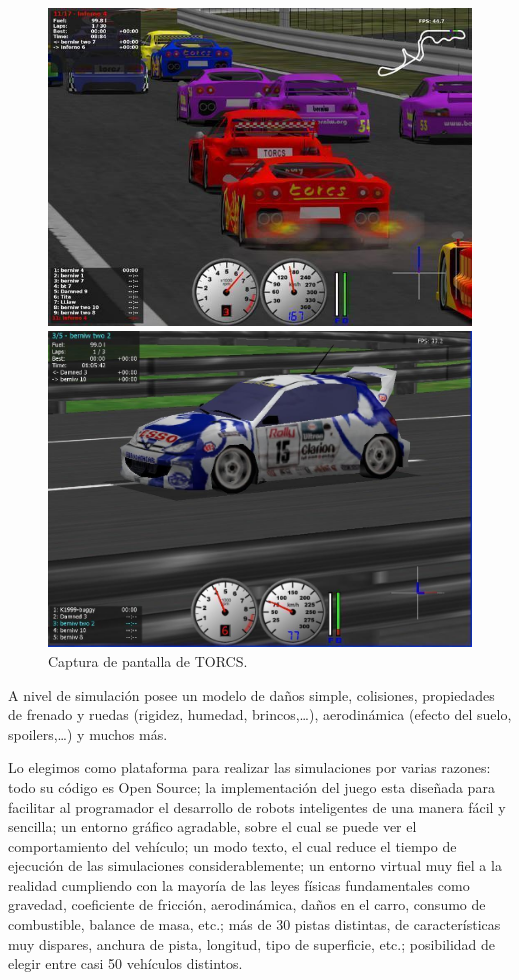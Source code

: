 \begin{figure}[ht]
\begin{minipage}[b]{0.5\linewidth}
\centering
\includegraphics[width=0.7\linewidth]{figures/torcs_screenshot3.jpg}
\end{minipage}
\begin{minipage}[b]{0.5\linewidth}
\centering
\includegraphics[width=0.7\linewidth]{figures/torcs3.jpg}
\end{minipage}
\caption{Captura de pantalla de \gls{TORCS}.}
\end{figure} 

A nivel de simulación posee un modelo de daños simple, colisiones, propiedades de frenado y ruedas (rigidez, humedad, brincos,…), aerodinámica (efecto del suelo, spoilers,…) y muchos más.

Lo elegimos como plataforma para realizar las simulaciones por varias razones: todo su código es \gls{Open Source}; la implementación del juego esta diseñada para facilitar al programador el desarrollo de robots inteligentes de una manera fácil y sencilla; un entorno gráfico agradable, sobre el cual se puede ver el comportamiento del vehículo; un modo texto, el cual reduce el tiempo de ejecución de las simulaciones considerablemente; un entorno virtual muy fiel a la realidad cumpliendo con la mayoría de las leyes físicas fundamentales como gravedad, coeficiente de fricción, aerodinámica, daños en el carro, consumo de combustible, balance de masa, etc.; más de 30 pistas distintas, de características muy dispares, anchura de pista, longitud, tipo de superficie, etc.; posibilidad de elegir entre casi 50 vehículos distintos.         
